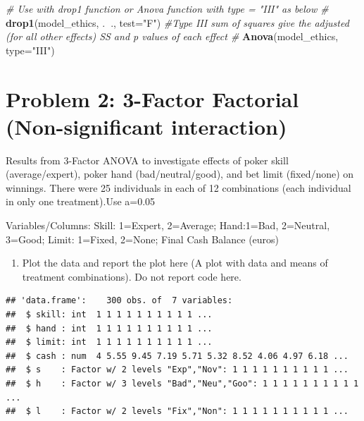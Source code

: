 \documentclass[]{article}
\newenvironment{Shaded}{\begin{snugshade}}{\end{snugshade}}
\newcommand{\CommentTok}[1]{\textcolor[rgb]{0.56,0.35,0.01}{\textit{#1}}}
\newcommand{\DataTypeTok}[1]{\textcolor[rgb]{0.13,0.29,0.53}{#1}}
\newcommand{\KeywordTok}[1]{\textcolor[rgb]{0.13,0.29,0.53}{\textbf{#1}}}
\newcommand{\NormalTok}[1]{#1}
\newcommand{\OperatorTok}[1]{\textcolor[rgb]{0.81,0.36,0.00}{\textbf{#1}}}
\newcommand{\StringTok}[1]{\textcolor[rgb]{0.31,0.60,0.02}{#1}}
\providecommand{\tightlist}{%
  \setlength{\itemsep}{0pt}\setlength{\parskip}{0pt}}
\begin{document}
\begin{Shaded}
\begin{Highlighting}[]
\CommentTok{# Use with drop1 function or Anova function with type = "III" as below #}
\KeywordTok{drop1}\NormalTok{(model_ethics, .}\OperatorTok{~}\NormalTok{., }\DataTypeTok{test=}\StringTok{"F"}\NormalTok{)}
\CommentTok{#Type III sum of squares give the adjusted (for all other effects) SS and p values of each effect #}
\KeywordTok{Anova}\NormalTok{(model_ethics, }\DataTypeTok{type=}\StringTok{"III"}\NormalTok{)}
\end{Highlighting}
\end{Shaded}

\hypertarget{problem-2-3-factor-factorial-non-significant-interaction}{%
\section{Problem 2: 3-Factor Factorial (Non-significant
interaction)}\label{problem-2-3-factor-factorial-non-significant-interaction}}

\textcolor[rgb]{0.5,0.5,0.5}{Results from 3-Factor ANOVA to investigate effects of poker skill (average/expert), poker hand (bad/neutral/good), and bet limit (fixed/none) on winnings. There were 25 individuals in each of 12 combinations (each individual in only one treatment).Use a=0.05}

\textcolor[rgb]{0.5,0.5,0.5}{Variables/Columns:
Skill: 1=Expert, 2=Average; Hand:1=Bad, 2=Neutral, 3=Good; Limit: 1=Fixed, 2=None; Final Cash Balance (euros)}

\begin{enumerate}
\def\labelenumi{(\alph{enumi})}
\tightlist
\item
  \textcolor[rgb]{0.5,0.5,0.5}{Plot the data and report the plot here (A plot with data and means of treatment combinations). Do not report code here.}
\end{enumerate}

\begin{verbatim}
## 'data.frame':    300 obs. of  7 variables:
##  $ skill: int  1 1 1 1 1 1 1 1 1 1 ...
##  $ hand : int  1 1 1 1 1 1 1 1 1 1 ...
##  $ limit: int  1 1 1 1 1 1 1 1 1 1 ...
##  $ cash : num  4 5.55 9.45 7.19 5.71 5.32 8.52 4.06 4.97 6.18 ...
##  $ s    : Factor w/ 2 levels "Exp","Nov": 1 1 1 1 1 1 1 1 1 1 ...
##  $ h    : Factor w/ 3 levels "Bad","Neu","Goo": 1 1 1 1 1 1 1 1 1 1 ...
##  $ l    : Factor w/ 2 levels "Fix","Non": 1 1 1 1 1 1 1 1 1 1 ...
\end{verbatim}
\end{document}
